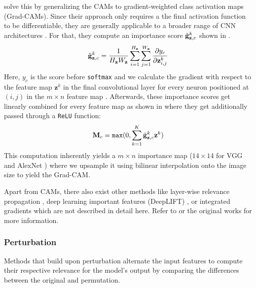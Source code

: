 \citet{SelvarajuCDVPB17} solve this by generalizing the CAMs to gradient-weighted class activation maps (Grad-CAMs). Since their approach only requires a the final activation function to be differentiable, they are generally applicable to a broader range of CNN architectures \citep{SelvarajuCDVPB17, xie2020explainable}. For that, they compute an importance score $\Tilde{\mathbf{g}}_{\mathbf{z},c}^k$ shown in .
\begin{equation}
\label{eq:grad_cam_importance}
     \Tilde{\mathbf{g}}_{\mathbf{z},c}^k = \frac{1}{H_\mathbf{z}W_\mathbf{z}} \sum_{i=1}^{H_\mathbf{z}} \sum_{j=1}^{W_\mathbf{z}} \frac{\partial y_c}{\partial \mathbf{z}^k_{i,j}}
\end{equation}
Here, $y_c$ is the score before \texttt{softmax} and we calculate the gradient with respect to the feature map $\mathbf{z}^k$ in the final convolutional layer for every neuron positioned at $(i,j)$ in the $m\times n$ feature map \citep{SelvarajuCDVPB17, xie2020explainable}. Afterwards, these importance scores get linearly combined for every feature map as shown in  where they get additionally passed through a \texttt{ReLU} function:
\begin{equation}
\label{eq:grad_cam_map}
    \mathbf{M}_c = \mathtt{max}(0,\sum_{k=1}^K\Tilde{\mathbf{g}}_{\mathbf{z},c}^k \mathbf{z}^k)
\end{equation}
This computation inherently yields a $m \times n$ importance map ($14 \times 14$ for VGG \citep{SimonyanZ14a} and AlexNet \citep{KrizhevskySH12}) where we upsample it using bilinear interpolation onto the image size to yield the Grad-CAM.

Apart from CAMs, there also exist other methods like layer-wise relevance propagation \citep{MontavonLBSM17, DingLLS17, LapuschkinBMMS16, Bach2015}, deep learning important features (DeepLIFT) \citep{ShrikumarGK17}, or integrated gradients \citep{SundararajanTY17} which are not described in detail here. Refer to \citet{xie2020explainable} or the original works for more information.

\subsubsection{Perturbation}
Methods that build upon perturbation alternate the input features to compute their respective relevance for the model's output by comparing the differences between the original and permutation.

